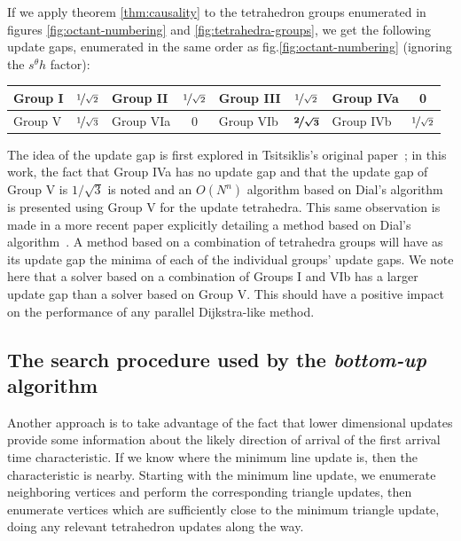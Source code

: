 \documentclass[smallcondensed]{svjour3}
\begin{document}
If we apply theorem \ref{thm:causality} to the tetrahedron groups
enumerated in figures \ref{fig:octant-numbering} and
\ref{fig:tetrahedra-groups}, we get the following update gaps,
enumerated in the same order as fig.\@ \ref{fig:octant-numbering}
(ignoring the $s^\theta h$ factor): \vspace{0.5em}
\begin{center}
  \begin{tabular}{lc|lc|lc|lc}
    Group I & $\nicefrac{1}{\sqrt{2}}$ & Group II & $\nicefrac{1}{\sqrt{2}}$ & Group III & $\nicefrac{1}{\sqrt{2}}$ & Group IVa & 0 \\
    \midrule
    Group V & $\nicefrac{1}{\sqrt{3}}$ & Group VIa & 0 & Group VIb & $\boldsymbol{\nicefrac{2}{\sqrt{3}}}$ & Group IVb & $\nicefrac{1}{\sqrt{2}}$
  \end{tabular}
\end{center}
\vspace{0.5em} The idea of the update gap is first explored in
Tsitsiklis's original paper~\cite{tsitsiklis1995efficient}; in this
work, the fact that Group IVa has no update gap and that the update
gap of Group V is $1/\sqrt{3}$ is noted and an $O(N^n)$ algorithm
based on Dial's algorithm is presented using Group V for the update
tetrahedra. This same observation is made in a more recent paper
explicitly detailing a method based on Dial's
algorithm~\cite{kim2001calo}. A method based on a combination of
tetrahedra groups will have as its update gap the minima of each of
the individual groups' update gaps. We note here that a solver based
on a combination of Groups I and VIb has a larger update gap than a
solver based on Group V. This should have a positive impact on the
performance of any parallel Dijkstra-like method.

\subsection{The search procedure used by the \emph{bottom-up}
  algorithm}\label{ssec:bottom-up-search}

Another approach is to take advantage of the fact that lower
dimensional updates provide some information about the likely
direction of arrival of the first arrival time characteristic. If we
know where the minimum line update is, then the characteristic is
nearby. Starting with the minimum line update, we enumerate
neighboring vertices and perform the corresponding triangle updates,
then enumerate vertices which are sufficiently close to the minimum
triangle update, doing any relevant tetrahedron updates along the way.
\end{document}
